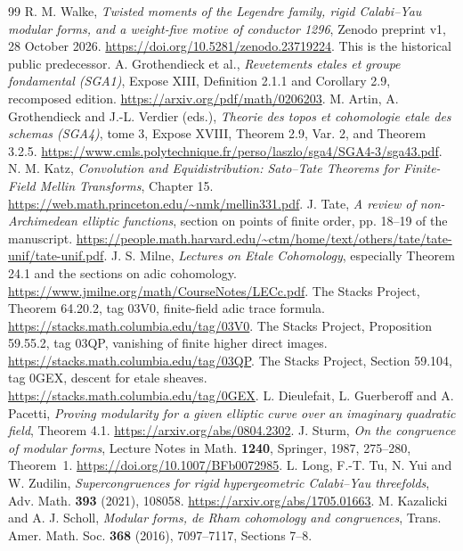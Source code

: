 \begin{thebibliography}{99}
 R. M. Walke,
\emph{Twisted moments of the Legendre family, rigid Calabi--Yau modular forms,
and a weight-five motive of conductor 1296}, Zenodo preprint v1,
28 October 2026. \url{https://doi.org/10.5281/zenodo.23719224}.
This is the historical public predecessor.
 A. Grothendieck et al.,
\emph{Revetements etales et groupe fondamental (SGA1)}, Expose XIII,
Definition 2.1.1 and Corollary 2.9, recomposed edition.
\url{https://arxiv.org/pdf/math/0206203}.
 M. Artin, A. Grothendieck and J.-L. Verdier (eds.),
\emph{Theorie des topos et cohomologie etale des schemas (SGA4)}, tome 3,
Expose XVIII, Theorem 2.9, Var. 2, and Theorem 3.2.5.
\url{https://www.cmls.polytechnique.fr/perso/laszlo/sga4/SGA4-3/sga43.pdf}.
 N. M. Katz,
\emph{Convolution and Equidistribution: Sato--Tate Theorems for
Finite-Field Mellin Transforms}, Chapter 15.
\url{https://web.math.princeton.edu/~nmk/mellin331.pdf}.
 J. Tate, \emph{A review of non-Archimedean elliptic functions},
section on points of finite order, pp. 18--19 of the manuscript.
\url{https://people.math.harvard.edu/~ctm/home/text/others/tate/tate-unif/tate-unif.pdf}.
 J. S. Milne, \emph{Lectures on Etale Cohomology},
especially Theorem 24.1 and the sections on adic cohomology.
\url{https://www.jmilne.org/math/CourseNotes/LECc.pdf}.
 The Stacks Project, Theorem 64.20.2, tag 03V0,
finite-field adic trace formula. \url{https://stacks.math.columbia.edu/tag/03V0}.
 The Stacks Project, Proposition 59.55.2, tag 03QP,
vanishing of finite higher direct images.
\url{https://stacks.math.columbia.edu/tag/03QP}.
 The Stacks Project, Section 59.104, tag 0GEX,
descent for etale sheaves. \url{https://stacks.math.columbia.edu/tag/0GEX}.
 L. Dieulefait, L. Guerberoff and A. Pacetti,
\emph{Proving modularity for a given elliptic curve over an imaginary
quadratic field}, Theorem 4.1. \url{https://arxiv.org/abs/0804.2302}.
 J. Sturm, \emph{On the congruence of modular forms},
Lecture Notes in Math. \textbf{1240}, Springer, 1987, 275--280,
Theorem~1. \url{https://doi.org/10.1007/BFb0072985}.
 L. Long, F.-T. Tu, N. Yui and W. Zudilin,
\emph{Supercongruences for rigid hypergeometric Calabi--Yau threefolds},
Adv. Math. \textbf{393} (2021), 108058.
\url{https://arxiv.org/abs/1705.01663}.
 M. Kazalicki and A. J. Scholl,
\emph{Modular forms, de Rham cohomology and congruences},
Trans. Amer. Math. Soc. \textbf{368} (2016), 7097--7117, Sections 7--8.

\end{thebibliography}

